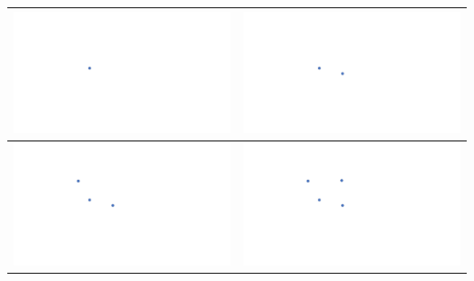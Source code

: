 \documentclass[a4paper,12pt]{article}
\begin{document}
\begin{tabular}{|c|c|}
\hline
\hspace{10pt}\includegraphics[width=0.425\linewidth]{../images/voronoi1.pdf}\hspace{10pt} & \hspace{10pt}\includegraphics[width=0.425\linewidth]{../images/voronoi2.pdf}\hspace{10pt} \\
\hline
\hspace{10pt}\includegraphics[width=0.425\linewidth]{../images/voronoi3.pdf}\hspace{10pt} & \hspace{10pt}\includegraphics[width=0.425\linewidth]{../images/voronoi4.pdf}\hspace{10pt} \\
\hline
\end{tabular}
\end{document}
